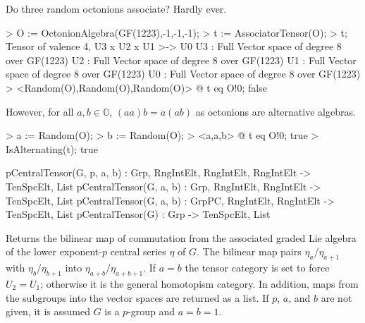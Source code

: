 \begin{example}[AssociatorFromAlgebra]

Do three random octonions associate? Hardly ever.

\begin{code}
> O := OctonionAlgebra(GF(1223),-1,-1,-1);
> t := AssociatorTensor(O);
> t;
Tensor of valence 4, U3 x U2 x U1 >-> U0
U3 : Full Vector space of degree 8 over GF(1223)
U2 : Full Vector space of degree 8 over GF(1223)
U1 : Full Vector space of degree 8 over GF(1223)
U0 : Full Vector space of degree 8 over GF(1223)
> <Random(O),Random(O),Random(O)> @ t eq O!0;
false
\end{code}

However, for all $a,b\in\mathbb{O}$, $(aa)b=a(ab)$ as octonions are alternative algebras.

\begin{code}
> a := Random(O); 
> b := Random(O); 
> <a,a,b> @ t eq O!0;
true
> IsAlternating(t);
true
\end{code}
\end{example}


\begin{intrinsics}
pCentralTensor(G, p, a, b) : Grp, RngIntElt, RngIntElt, RngIntElt -> TenSpcElt, List
pCentralTensor(G, a, b) : Grp, RngIntElt, RngIntElt -> TenSpcElt, List
pCentralTensor(G, a, b) : GrpPC, RngIntElt, RngIntElt -> TenSpcElt, List
pCentralTensor(G) : Grp -> TenSpcElt, List
\end{intrinsics}

Returns the bilinear map of commutation from the associated graded Lie algebra of the lower exponent-$p$ central
series $\eta$ of $G$.  The bilinear map pairs $\eta_a/\eta_{a+1}$ with $
\eta_{b}/\eta_{b+1}$ into $\eta_{a+b}/\eta_{a+b+1}$.  If $a=b$ the tensor 
category is set to force $U_2=U_1$; 
otherwise it is the general homotopism category.
In addition, maps from the subgroups into the vector spaces are returned as a list. 
If $p$, $a$, and $b$ are not given, it is assumed $G$ is a $p$-group and $a=b=1$.

